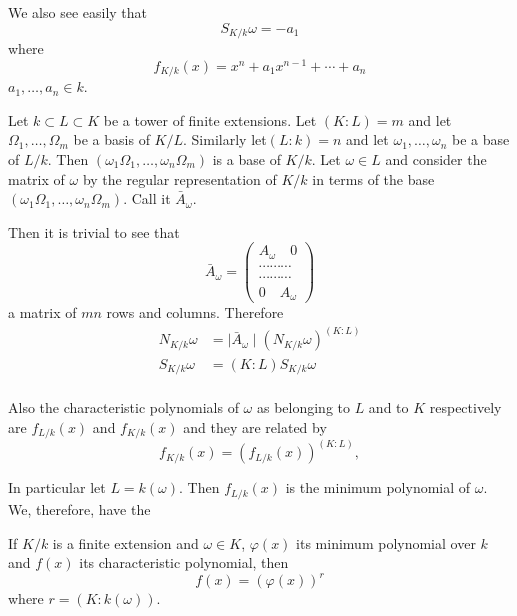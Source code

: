   We also see easily that 
  \begin{equation*}
S_{K/k} \omega = -a_1 \tag{2}\label{c4:eq2}  
  \end{equation*}  
  where
  $$
  f_{K/k} (x)  = x^n + a_1 x^{n-1}+ \cdots + a_n  
  $$
\noindent
$a_1 , \ldots , a_n  \in k$. 

Let $k \subset L \subset K$  be a tower of finite extensions. Let
$(K:L) = m$ and let $\Omega_1, \ldots, \Omega_m$ be a basis of $K/L
$. Similarly let\pageoriginale $(L:k)=n$ and let $ \omega_1 , \ldots , 
\omega_n$ be a base of $ L/k $. Then $(\omega_1 \Omega_1 , \ldots
, \omega_n \Omega_m) $ is  a base of $ K/k $. Let $ \omega \in L $
and consider the  matrix of $ \omega $ by the regular representation
of $ K/k $  in terms of the base  $ ( \omega_1 \Omega_1 , \ldots ,
\omega_n \Omega_m ) $. Call it $ \bar{A}_\omega $. 

Then it is  trivial to see that 
$$
\bar{A}_\omega   = \begin{pmatrix} A_\omega  \quad  0 \\  \cdots
  \cdots \cdots  \\  \cdots \cdots \cdots \\  0  \quad
  A_\omega\end{pmatrix} 
$$ 
a matrix of  $mn$ rows and columns. Therefore 
\begin{align*}
N_{K/k} \omega &= \mid \bar{A}_\omega \mid ( N_{K/k} \omega ) ^{ (K:L) } \\
S_{K/k} \omega  &= ( K : L )  S_{K/k} \omega\\
\end{align*}

Also the characteristic polynomials of $ \omega $ as belonging to $L$
and to $K$ respectively are $ f_{L/k} (x) $ and $ f_{K/k}   (x) $ and
they are  related by  
\begin{equation*}
f_{K/k}   (x) = (f_{L/k} (x))^{(K : L)} , \tag{3}\label{c4:eq3}
\end{equation*}

In particular let $ L = k(\omega)$. Then $f_{L/k} (x)$ is the
minimum polynomial of $ \omega $. We, therefore, have the

\setcounter{thm}{0}
\begin{thm}\label{c4:thm1}%
If $ K/k $ is a finite extension and $ \omega \in K $, $ \varphi
   (x) $ its minimum polynomial over $k$ and $f (x) $ its
   characteristic polynomial, then 
 $$
 f (x) = ( \varphi (x)  )^r
 $$
where $ r =  (K:k (\omega) ) $.
 \end{thm} 
 
